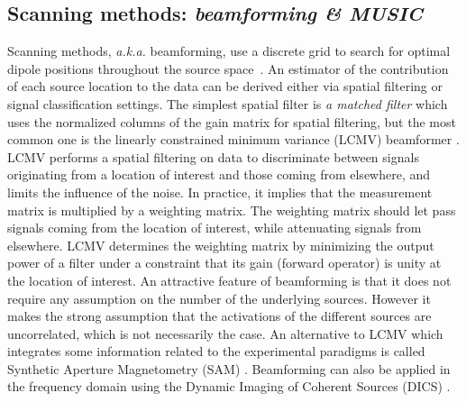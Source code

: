\subsection{Scanning methods: \textit{beamforming \& MUSIC}} \label{section_scanning}
Scanning methods, \textit{a.k.a.} beamforming, use a discrete grid to search for optimal dipole positions throughout the source space~\cite{hillebrand2005new,mosher99mulsigclassif,scherg1985two}. An estimator of the contribution of each source location to the data can be derived either via spatial filtering or signal classification settings. The simplest spatial filter is \textit{a matched filter} which uses the normalized columns of the gain matrix for spatial filtering, but the most common one is the linearly constrained minimum variance (LCMV) beamformer \cite{van1997localization}.\\
LCMV performs a spatial filtering on data to discriminate between signals originating from a location of interest and those coming from elsewhere, and limits the influence of the noise. In practice, it implies that the measurement matrix is multiplied by a weighting matrix. The weighting matrix should let pass signals coming from the location of interest, while attenuating signals from elsewhere. LCMV determines the weighting matrix by minimizing the output power of a filter under a constraint that its gain (forward operator) is unity at the location of interest. An attractive feature of beamforming is that it does not require any assumption on the number of the underlying sources. However it makes the strong assumption that the activations of the different sources are uncorrelated, which is not necessarily the case. An alternative to LCMV which integrates some information related to the experimental paradigms is called Synthetic Aperture Magnetometry (SAM) \cite{vrba2001signal}. Beamforming can also be applied in the frequency domain using the Dynamic Imaging of Coherent Sources (DICS) \cite{gross2001dynamic}.

